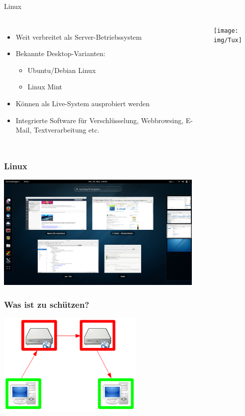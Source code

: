 \documentclass[12pt]{beamer}
\begin{document}
\begin{frame}{Linux}
  \begin{columns}
    \column{8cm}
    \begin{itemize}
      \item Weit verbreitet als Server-Betriebssystem
      \item Bekannte Desktop-Varianten: 

      \begin{itemize}
        \item Ubuntu/Debian Linux
        \item Linux Mint
      \end{itemize}
      \item Können als Live-System ausprobiert werden
      \item Integrierte Software für Verschlüsselung, Webbrowsing, E-Mail, Textverarbeitung
      etc.
    \end{itemize}
    \column{6cm}

    \begin{center}
      \texttt{[image: img/Tux]}
    \par\end{center}
  \end{columns}
\end{frame}

\begin{frame}
  \frametitle{Linux}
  \begin{center}
    \includegraphics[width=10cm]{img/gnome}
  \par\end{center}
\end{frame}

\begin{frame}
    \frametitle{Was ist zu schützen?}
    \begin{center}
      \includegraphics[height=5cm]{img/fed-clients.png}
    \end{center}
\end{frame}
\end{document}
